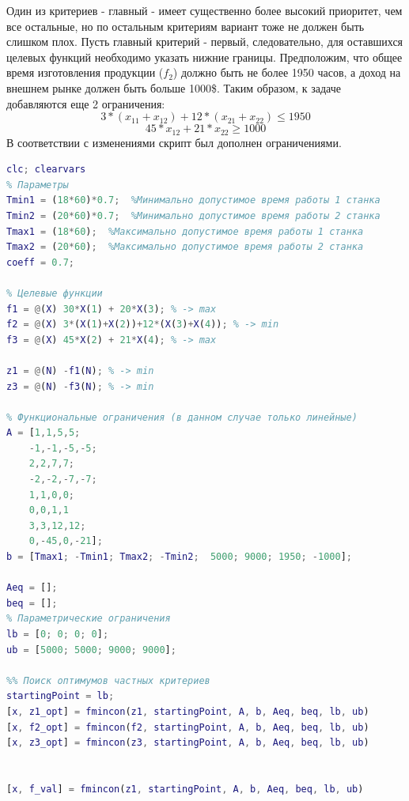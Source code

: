 Один из критериев - главный - имеет существенно более высокий приоритет, чем все остальные, но по остальным критериям вариант тоже не должен быть слишком плох. Пусть главный критерий - первый, следовательно, для оставшихся целевых функций необходимо указать нижние границы. Предположим, что общее время изготовления продукции ($f_2$) должно быть не более 1950 часов, а доход на внешнем рынке должен быть больше 1000\$. Таким образом, к задаче добавляются еще 2 ограничения:
\begin{equation}
3*(x_{11}+x_{12})+12*(x_{21}+x_{22})\leq 1950 
\end{equation}
\begin{equation}
45*x_{12}+21*x_{22}\geq 1000
\end{equation}
В соответствии с изменениями скрипт был дополнен ограничениями.
\begin{lstlisting}[language={matlab}, caption={Скрипт с выделением главного критерия}, label={lst:2}]
clc; clearvars
% Параметры
Tmin1 = (18*60)*0.7;  %Минимально допустимое время работы 1 станка
Tmin2 = (20*60)*0.7;  %Минимально допустимое время работы 2 станка
Tmax1 = (18*60);  %Максимально допустимое время работы 1 станка
Tmax2 = (20*60);  %Максимально допустимое время работы 2 станка
coeff = 0.7;

% Целевые функции
f1 = @(X) 30*X(1) + 20*X(3); % -> max
f2 = @(X) 3*(X(1)+X(2))+12*(X(3)+X(4)); % -> min
f3 = @(X) 45*X(2) + 21*X(4); % -> max

z1 = @(N) -f1(N); % -> min
z3 = @(N) -f3(N); % -> min

% Функциональные ограничения (в данном случае только линейные)
A = [1,1,5,5;
    -1,-1,-5,-5;
    2,2,7,7;
    -2,-2,-7,-7;
    1,1,0,0;
    0,0,1,1
    3,3,12,12;
    0,-45,0,-21];
b = [Tmax1; -Tmin1; Tmax2; -Tmin2;  5000; 9000; 1950; -1000];

Aeq = [];
beq = [];
% Параметрические ограничения
lb = [0; 0; 0; 0];
ub = [5000; 5000; 9000; 9000];

%% Поиск оптимумов частных критериев
startingPoint = lb;
[x, z1_opt] = fmincon(z1, startingPoint, A, b, Aeq, beq, lb, ub)
[x, f2_opt] = fmincon(f2, startingPoint, A, b, Aeq, beq, lb, ub)
[x, z3_opt] = fmincon(z3, startingPoint, A, b, Aeq, beq, lb, ub)


[x, f_val] = fmincon(z1, startingPoint, A, b, Aeq, beq, lb, ub)
\end{lstlisting}

